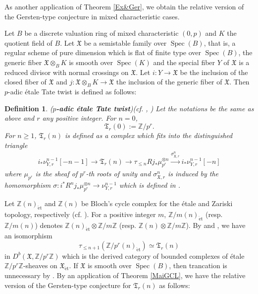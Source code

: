 \documentclass{article}
\newtheorem{defi}[thm]{\indent \sc Definition}
\newcommand{\spec}{\operatorname{Spec}}
\newcommand{\et}{\mathrm{\acute{e}t}}
\begin{document}
\vspace{2.0mm}

As another application of Theorem \ref{Ex&Ger},
we obtain the relative version of the Gersten-type conjecture in mixed characteristic cases.

Let $B$ be a discrete valuation ring of mixed characteristic $(0, p)$ and 
$K$ the quotient field of $B$. Let $\mathfrak{X}$ be a semistable family
over $\spec(B)$, that is, a regular scheme of pure dimension which is flat
of finite type over $\spec(B)$,
the generic fiber 
$\mathfrak{X}\otimes_{B}K$ is smooth over $\spec(K)$
and the special fiber $Y$ of $\mathfrak{X}$ is a reduced divisor with normal
crossings on $\mathfrak{X}$.
Let $i: Y\to \mathfrak{X}$ be the inclusion of the closed fiber of $\mathfrak{X}$
and
$j: \mathfrak{X}\otimes_{B}K\to \mathfrak{X}$
the inclusion of the generic fiber of $\mathfrak{X}$.
Then $p$-adic \'{e}tale Tate twist is defined as follows:
%
\begin{defi}\upshape(\textbf{$p$-adic \'{e}tale Tate twist})\label{DefT}
(cf. \cite[pp.537--538, Definition 4.2.4]{SaP}, 
\cite[p.187, Remark 3.7]{SaR})
Let the notations be the same as above and $r$ any positive integer. For $n=0$,
%
\begin{equation*}
\mathfrak{T}_{r}(0)
:=
\mathbb{Z}/p^{r}.
\end{equation*}
%
For $n\geq 1$, 
$\mathfrak{T}_{r}(n)$ is defined as a complex which fits into
the distinguished triangle
%
\begin{align*}
i_{*}\nu_{Y, r}^{n-1}[-n-1]
\to
\mathfrak{T}_{r}(n)
\to
\tau_{\leq n}Rj_{*}\mu_{p^{r}}^{\otimes n}
\xrightarrow{\sigma^{n}_{\mathfrak{X}, r}}
i_{*}\nu_{Y, r}^{n-1}[-n]
\end{align*}
%
where $\mu_{p^{r}}$ is the sheaf of $p^{r}$-th roots of unity
and $\sigma^{n}_{\mathfrak{X}, r}$ is induced by
the homomorphism
$\sigma: i^{*}R^{n}j_{*}\mu_{p^{r}}^{\otimes n}\to \nu^{n-1}_{Y, r}$ 
which is defined in 
\cite[p.186, Theorem 3.4]{SaR}.
\end{defi}
%

Let 
$\mathbb{Z}(n)_{\et}$ and $\mathbb{Z}(n)$ be Bloch's cycle
complex for the \'{e}tale and Zariski topology, respectively 
(cf. \cite[p.779]{Ge}). For a positive integer $m$,
$\mathbb{Z}/m(n)_{\et}$ 
(resp. $\mathbb{Z}/m(n)$) denotes
$\mathbb{Z}(n)_{\et}\otimes \mathbb{Z}/m\mathbb{Z}$
(resp. $\mathbb{Z}(n)\otimes \mathbb{Z}/m\mathbb{Z}$).
By \cite[pp.209--210, Remark 7.2]{SaR} and \cite[Proposition 1.5]{Sak4}, 
we have an isomorphism
%
\begin{equation*}
\tau_{\leq n+1}\left(
\mathbb{Z}/p^{r}(n)_{\et}
\right)
\simeq 
\mathfrak{T}_{r}(n)
\end{equation*}
%
in
$D^{b}(\mathfrak{X}, \mathbb{Z}/p^{r}\mathbb{Z})$
which is the derived category of bounded complexes
of \'{e}tale $\mathbb{Z}/p^{r}\mathbb{Z}$-sheaves
on $\mathfrak{X}_{\et}$. If $\mathfrak{X}$ is
smooth over $\spec(B)$,
then trancation is unnecessary by \cite[p.786, Corollary 4.4]{Ge}.
By an application of Theorem \ref{MaiGCL}, we have the relative version of the
Gersten-type conjecture for $\mathfrak{T}_{r}(n)$ as follows:
\end{document}
